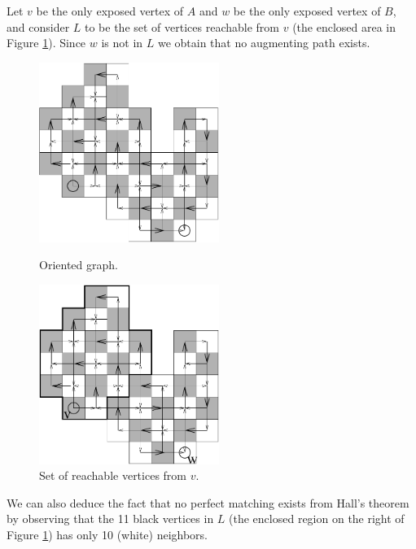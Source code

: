 \documentclass[12pt]{article}
\begin{document}
\begin{enumerate}
\begin{enumerate}
Let $v$ be the only exposed vertex of $A$ and $w$ be the only exposed
vertex of $B$, and consider $L$ to be the set of vertices reachable
from $v$ (the enclosed area in Figure \ref{fig:domino34}). Since $w$
is not in $L$ we obtain that no augmenting path exists.
\begin{figure}[ht]
\begin{minipage}[b]{0.5\linewidth} %
\begin{center}
\includegraphics[height=2.3in]{../figures/domino3}
\end{center}
\caption{Oriented graph.}
\end{minipage}
\hspace{0.5cm} %
\begin{minipage}[b]{0.5\linewidth}
\begin{center}
\includegraphics[height=2.3in]{../figures/domino4}
\end{center}
\caption{Set of reachable vertices from $v$.\label{fig:domino34}}
\end{minipage}
\end{figure}

We can also deduce the fact that no perfect matching exists from
Hall's theorem by observing that the 11 black vertices in $L$ (the
enclosed region on the right of Figure \ref{fig:domino34}) has only 10
(white) neighbors. 
\end{enumerate}


\end{enumerate}
\end{document}
